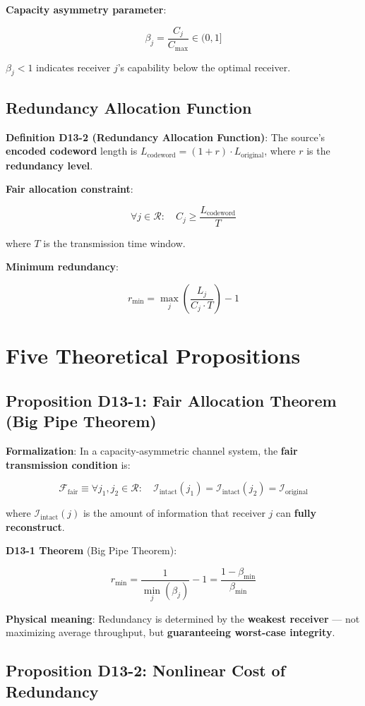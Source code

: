 \documentclass[12pt,a4paper]{article}
\newcommand{\calR}{\mathcal{R}}
\newcommand{\calInt}{\mathcal{I}_{\text{intact}}}
\newcommand{\calOrig}{\mathcal{I}_{\text{original}}}
\newcommand{\calCmax}{C_{\max}}
\newcommand{\calFfair}{\mathcal{F}_{\text{fair}}}
\newcommand{\betamin}{\beta_{\min}}
\newcommand{\betaj}{\beta_j}
\begin{document}
\textbf{Capacity asymmetry parameter}:

$$\betaj = \frac{C_j}{\calCmax} \in (0, 1]$$

$\betaj < 1$ indicates receiver $j$'s capability below the optimal receiver.

\subsection{Redundancy Allocation Function}

\textbf{Definition D13-2 (Redundancy Allocation Function)}: The source's \textbf{encoded codeword} length is $L_{\text{codeword}} = (1 + r) \cdot L_{\text{original}}$, where $r$ is the \textbf{redundancy level}.

\textbf{Fair allocation constraint}:

$$\forall j \in \calR: \quad C_j \geq \frac{L_{\text{codeword}}}{T}$$

where $T$ is the transmission time window.

\textbf{Minimum redundancy}:

$$r_{\min} = \max_{j} \left(\frac{L_j}{C_j \cdot T}\right) - 1$$

\section{Five Theoretical Propositions}

\subsection{Proposition D13-1: Fair Allocation Theorem (Big Pipe Theorem)}

\textbf{Formalization}: In a capacity-asymmetric channel system, the \textbf{fair transmission condition} is:

$$\calFfair \equiv \forall j_1, j_2 \in \calR: \quad \calInt(j_1) = \calInt(j_2) = \calOrig$$

where $\calInt(j)$ is the amount of information that receiver $j$ can \textbf{fully reconstruct}.

\textbf{D13-1 Theorem} (Big Pipe Theorem):

$$r_{\min} = \frac{1}{\min_j(\betaj)} - 1 = \frac{1 - \betamin}{\betamin}$$

\textbf{Physical meaning}: Redundancy is determined by the \textbf{weakest receiver} --- not maximizing average throughput, but \textbf{guaranteeing worst-case integrity}.

\subsection{Proposition D13-2: Nonlinear Cost of Redundancy}
\end{document}
